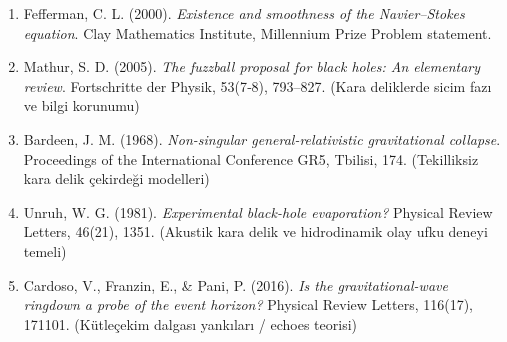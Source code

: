 \documentclass[12pt,a4paper]{article}
\begin{document}
\begin{enumerate}
    \item Fefferman, C. L. (2000). \textit{Existence and smoothness of the Navier--Stokes equation}. Clay Mathematics Institute, Millennium Prize Problem statement.
    \item Mathur, S. D. (2005). \textit{The fuzzball proposal for black holes: An elementary review}. Fortschritte der Physik, 53(7‐8), 793–827. (Kara deliklerde sicim fazı ve bilgi korunumu)
    \item Bardeen, J. M. (1968). \textit{Non-singular general-relativistic gravitational collapse}. Proceedings of the International Conference GR5, Tbilisi, 174. (Tekilliksiz kara delik çekirdeği modelleri)
    \item Unruh, W. G. (1981). \textit{Experimental black-hole evaporation?} Physical Review Letters, 46(21), 1351. (Akustik kara delik ve hidrodinamik olay ufku deneyi temeli)
    \item Cardoso, V., Franzin, E., \& Pani, P. (2016). \textit{Is the gravitational-wave ringdown a probe of the event horizon?} Physical Review Letters, 116(17), 171101. (Kütleçekim dalgası yankıları / echoes teorisi)
\end{enumerate}
\end{document}
